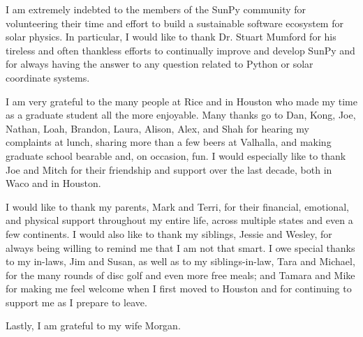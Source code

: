 \begin{acknowledgements}
I am extremely indebted to the members of the SunPy community for volunteering their time and effort to build a sustainable software ecosystem for solar physics. In particular, I would like to thank Dr. Stuart Mumford for his tireless and often thankless efforts to continually improve and develop SunPy and for always having the answer to any question related to Python or solar coordinate systems.

I am very grateful to the many people at Rice and in Houston who made my time as a graduate student all the more enjoyable. Many thanks go to Dan, Kong, Joe, Nathan, Loah, Brandon, Laura, Alison, Alex, and Shah for hearing my complaints at lunch, sharing more than a few beers at Valhalla, and making graduate school bearable and, on occasion, fun. I would especially like to thank Joe and Mitch for their friendship and support over the last decade, both in Waco and in Houston.

I would like to thank my parents, Mark and Terri, for their financial, emotional, and physical support throughout my entire life, across multiple states and even a few continents. I would also like to thank my siblings, Jessie and Wesley, for always being willing to remind me that I am not that smart. I owe special thanks to my in-laws, Jim and Susan, as well as to my siblings-in-law, Tara and Michael, for the many rounds of disc golf and even more free meals; and Tamara and Mike for making me feel welcome when I first moved to Houston and for continuing to support me as I prepare to leave.

Lastly, I am grateful to my wife Morgan.
\end{acknowledgements}
